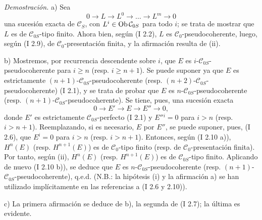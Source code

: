 \emph{Demostración.} a) Sea
\[
0\longrightarrow L\longrightarrow L^0\longrightarrow\ldots\longrightarrow L^m\longrightarrow0
\]
una sucesión exacta de $\mathcal C_S$, con $L^i\in\operatorname{Ob}\mathcal C_{0S}$ para todo $i$; se trata de mostrar que $L$ es de $\mathcal C_{0S}$-tipo finito. Ahora bien, según (I 2.2), $L$ es $\mathcal C_0$-pseudocoherente, luego, según (I 2.9), de $\mathcal C_0$-presentación finita, y la afirmación resulta de (ii).

b) Mostremos, por recurrencia descendente sobre $i$, que $E$ es $i$-$\mathcal C_{0S}$-pseudocoherente para $i\ge n$ (resp. $i\ge n+1$). Se puede suponer ya que $E$ es estrictamente $(n+1)$-$\mathcal C_{0S}$-pseudocoherente (resp. $(n+2)$-$\mathcal C_{0S}$-pseudocoherente) (I 2.1), y se trata de probar que $E$ es $n$-$\mathcal C_{0S}$-pseudocoherente (resp. $(n+1)$-$\mathcal C_{0S}$-pseudocoherente). Se tiene, pues, una sucesión exacta
\[
0\longrightarrow E'\longrightarrow E\longrightarrow E''\longrightarrow0,
\]
donde $E'$ es estrictamente $\mathcal C_{0S}$-perfecto (I 2.1) y $E''{}^i=0$ para $i>n$ (resp. $i>n+1$). Reemplazando, si es necesario, $E$ por $E''$, se puede suponer, pues, (I 2.6), que $E^i=0$ para $i>n$ (resp. $i>n+1$). Entonces, según (I 2.10 a)), $H^n(E)$ (resp. $H^{n+1}(E)$) es de $\mathcal C_0$-tipo finito (resp. de $\mathcal C_0$-presentación finita). Por tanto, según (ii), $H^n(E)$ (resp. $H^{n+1}(E)$) es de $\mathcal C_{0S}$-tipo finito. Aplicando de nuevo (I 2.10 b)), se deduce que $E$ es $n$-$\mathcal C_{0S}$-pseudocoherente (resp. $(n+1)$-$\mathcal C_{0S}$-pseudocoherente), q.e.d. (N.B.: la hipótesis (i) y la afirmación a) se han utilizado implícitamente en las referencias a (I 2.6 y 2.10)).

c) La primera afirmación se deduce de b), la segunda de (I 2.7); la última es evidente.
